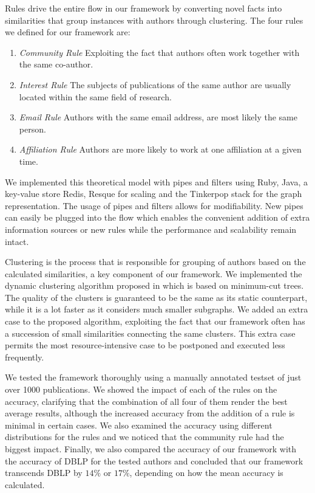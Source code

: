 Rules drive the entire flow in our framework by converting novel facts into similarities that group instances with authors through clustering. The four rules we defined for our framework are:

\begin{enumerate}
	\item \textit{Community Rule} Exploiting the fact that authors often work together with the same co-author.
	\item \textit{Interest Rule} The subjects of publications of the same author are usually located within the same field of research.
	\item \textit{Email Rule} Authors with the same email address, are most likely the same person.
	\item \textit{Affiliation Rule} Authors are more likely to work at one affiliation at a given time.
\end{enumerate}

We implemented this theoretical model with pipes and filters using Ruby, Java, a key-value store Redis, Resque for scaling and the Tinkerpop stack for the graph representation. The usage of pipes and filters allows for modifiability. New pipes can easily be plugged into the flow which enables the convenient addition of extra information sources or new rules while the performance and scalability remain intact.

Clustering is the process that is responsible for grouping of authors based on the calculated similarities, a key component of our framework. We implemented the dynamic clustering algorithm proposed in \cite{saha2006dynamic} which is based on minimum-cut trees. The quality of the clusters is guaranteed to be the same as its static counterpart, while it is a lot faster as it considers much smaller subgraphs. We added an extra case to the proposed algorithm, exploiting the fact that our framework often has a succession of small similarities connecting the same clusters. This extra case permits the most resource-intensive case to be postponed and executed less frequently.



We tested the framework thoroughly using a manually annotated testset of just over 1000 publications. We showed the impact of each of the rules on the accuracy, clarifying that the combination of all four of them render the best average results, although the increased accuracy from the addition of a rule is minimal in certain cases. We also examined the accuracy using different distributions for the rules and we noticed that the community rule had the biggest impact. Finally, we also compared the accuracy of our framework with the accuracy of DBLP for the tested authors and concluded that our framework transcends DBLP by $14\%$ or $17\%$, depending on how the mean accuracy is calculated.


